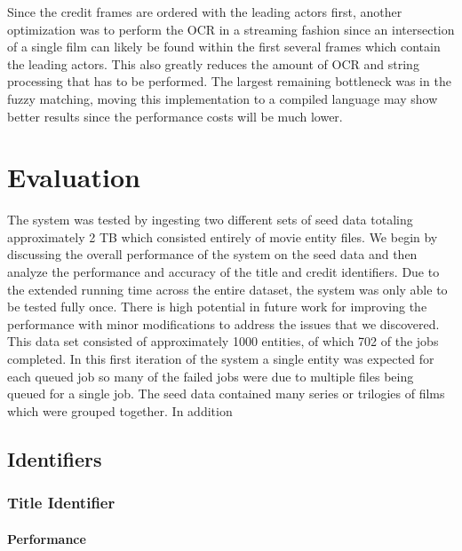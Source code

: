 \documentclass[paper=a4, fontsize=11pt]{scrartcl} %
\numberwithin{equation}{section} %
\numberwithin{figure}{section} %
\numberwithin{table}{section} %
\begin{document}
Since the credit frames are ordered with the leading actors first, another optimization was to perform the OCR in a streaming fashion since an intersection of a single film can likely be found within the first several frames which contain the leading actors. This also greatly reduces the amount of OCR and string processing that has to be performed. The largest remaining bottleneck was in the fuzzy matching, moving this implementation to a compiled language may show better results since the performance costs will be much lower. \\

\section{Evaluation}
\label{sec:evaluation}

The system was tested by ingesting two different sets of seed data totaling approximately 2 TB which consisted entirely of movie entity files. We begin by discussing the overall performance of the system on the seed data and then analyze the performance and accuracy of the title and credit identifiers. Due to the extended running time across the entire dataset, the system was only able to be tested fully once. There is high potential in future work for improving the performance with minor modifications to address the issues that we discovered. \\

This data set consisted of approximately 1000 entities, of which 702 of the jobs completed. In this first iteration of the system a single entity was expected for each queued job so many of the failed jobs were due to multiple files being queued for a single job. The seed data contained many series or trilogies of films which were grouped together. In addition 

\subsection{Identifiers}
\label{sec:identifiers-performance}

\subsubsection{Title Identifier}
\label{sec:title-identifier-performance}

\paragraph{Performance}
\end{document}
